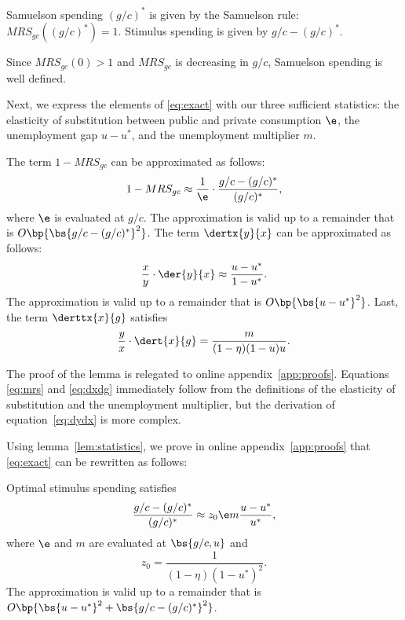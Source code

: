 \documentclass[letterpaper,12pt,leqno]{article}
\begin{document}
\begin{bibunit}
\begin{defn} Samuelson spending $(g/c)^{*}$ is given by the Samuelson rule: $MRS_{gc}((g/c)^{*})=1$. Stimulus spending is given by $g/c-(g/c)^{*}$.\end{defn}

Since $MRS_{gc}(0)> 1$ and $MRS_{gc}$ is decreasing in $g/c$, Samuelson spending is well defined. 

Next, we express the elements of \eqref{eq:exact} with our three sufficient statistics: the elasticity of substitution between public and private consumption $\e$, the unemployment gap $u-u^*$, and the unemployment multiplier $m$.

\begin{lem}\label{lem:statistics} The term $1-MRS_{gc}$ can be approximated as follows:
\begin{equation}
1-MRS_{gc}\approx \frac{1}{\e}\cdot \frac{g/c-(g/c)^*}{(g/c)^*},
\label{eq:mrs}\end{equation}
where $\e$ is evaluated at $g/c$. The approximation is valid up to a remainder that is $O\bp{\bs{g/c-(g/c)^{*}}^{2}}$. The term $\dertx{y}{x}$ can be approximated as follows:
\begin{equation}
\frac{x}{y}\cdot\der{y}{x}\approx \frac{u-u^*}{1-u^{*}}.
\label{eq:dydx}\end{equation}
The approximation is valid up to a remainder that is $O\bp{\bs{u-u^{*}}^{2}}$. Last, the term $\derttx{x}{g}$ satisfies
\begin{equation}
\frac{y}{x}\cdot \dert{x}{g}= \frac{m}{(1-\eta) (1-u)  u }.
\label{eq:dxdg}\end{equation}\end{lem}

The proof of the lemma is relegated to online appendix~\ref{app:proofs}. Equations \eqref{eq:mrs} and \eqref{eq:dxdg} immediately follow from the definitions of the elasticity of substitution and the unemployment multiplier, but the derivation of equation~\eqref{eq:dydx} is more complex.

Using lemma~\ref{lem:statistics}, we prove in online appendix~\ref{app:proofs} that \eqref{eq:exact} can be rewritten as follows:

\begin{lem}\label{lem:implicit} Optimal stimulus spending satisfies
\begin{equation}
\frac{g/c-(g/c)^{*}}{(g/c)^{*}}\approx z_0  \e m \frac{u-u^{*}}{u^{*}},
\label{eq:implicit}\end{equation}
where $\e$ and $m$ are evaluated at $\bs{g/c,u}$ and 
\begin{equation*}
z_0 = \frac{1}{(1-\eta)  (1-u^*)^2}. 
\end{equation*}
The approximation is valid up to a remainder that is $O\bp{\bs{u-u^{*}}^{2}+\bs{g/c-(g/c)^{*}}^{2}}$.\end{lem}


\end{bibunit}
\end{document}
